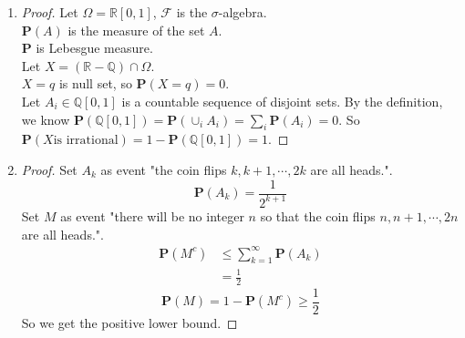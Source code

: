 \documentclass{article}
\begin{document}
\begin{enumerate}
        \item \begin{proof}
            Let $\Omega = \mathbb{R}[0,1]$, $\mathcal{F}$ is the $\sigma$-algebra.\\
            $\mathbf{P}(A)$ is the measure of the set $A$.\\
            $\mathbf{P}$ is Lebesgue measure.\\
            Let $X=(\mathbb{R}-\mathbb{Q})\cap \Omega$.\\
            $X={q}$ is null set, so $\mathbf{P}(X=q)=0$.\\
            Let $A_i \in \mathbb{Q}[0,1]$ is a countable sequence of disjoint sets. By the definition, we know
            $\mathbf{P}(\mathbb{Q}[0,1])=\mathbf{P}(\cup_i A_i) = \sum_i \mathbf{P}(A_i) = 0$.
            So $\mathbf{P}(X \text{is irrational}) = 1 - \mathbf{P}(\mathbb{Q}[0,1]) = 1$.
        \end{proof}

        \item \begin{proof}
            Set $A_k$ as event "the coin flips $k,k+1, \cdots, 2k$ are all heads.".\\
            $$\mathbf{P}(A_k)=\frac{1}{2^{k+1}}$$
            Set $M$ as event "there will be no integer $n$ so that the coin flips $n,n+1,\cdots, 2n$ are all heads.".
            \begin{align*}
                \mathbf{P}(M^c) &\leqslant\sum_{k=1}^{\infty}\mathbf{P}(A_k)\\
                &=\frac{1}{2}
            \end{align*}
            $$\mathbf{P}(M) = 1-\mathbf{P}(M^c) \geqslant \frac{1}{2}$$
            So we get the positive lower bound.
        \end{proof}
    \end{enumerate}
\end{document}
